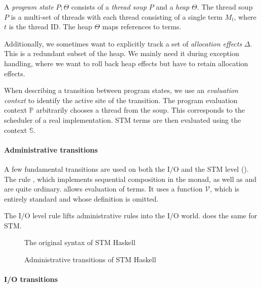 A \emph{program state} $P;\Theta$ consists of a \emph{thread soup} $P$ and a \emph{heap} $\Theta$.
The thread soup $P$ is a multi-set of threads with each thread consisting of a single term $M_t$, where $t$ is the thread ID.
The heap $\Theta$ maps references to terms.

Additionally, we sometimes want to explicitly track a set of \emph{allocation effects} $\Delta$.
This is a redundant subset of the heap.
We mainly need it during exception handling, where we want to roll back heap effects but have to retain allocation effects.

When describing a transition between program states, we use an \emph{evaluation context} to identify the active site of the transition.
The program evaluation context $\mathbb{P}$ arbitrarily chooses a thread from the soup.
This corresponds to the scheduler of a real implementation.
STM terms are then evaluated using the context $\mathbb{S}$.

\paragraph{Administrative transitions}

A few fundamental transitions are used on both the I/O and the STM level ().
The rule , which implements sequential composition in the monad, as well as  and  are quite ordinary.
 allows evaluation of terms.
It uses a function $\mathcal{V}$, which is entirely standard and whose definition is omitted.

The I/O level rule  lifts administrative rules into the I/O world.  does the same for STM.

\begin{figure}[p]

\caption{The original syntax of STM Haskell \parencite{harris-et-al-2005}}
\label{fig:orig-syntax}
\end{figure}

\begin{figure}[p]

\caption{Administrative transitions of STM Haskell \parencite{harris-et-al-2005}}
\label{fig:orig-admin}
\end{figure}


\clearpage

\paragraph{I/O transitions}

